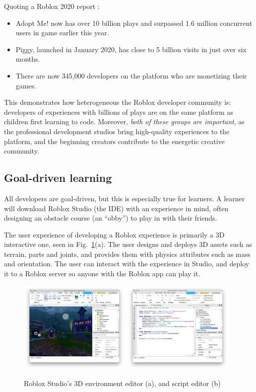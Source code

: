\documentclass[acmsmall]{acmart}
\begin{document}
Quoting a Roblox 2020 report \cite{RobloxDevelopers}:
\begin{itemize}
\item Adopt Me! now has over 10 billion plays and surpassed 1.6 million concurrent users in game earlier this year.
\item Piggy, launched in January 2020, has close to 5 billion visits in just over six months.
\item There are now 345,000 developers on the platform who are monetizing their games.
\end{itemize}
This demonstrates how heterogeneous the Roblox developer community is:
developers of experiences with billions of plays are on the same
platform as children first learning to code. Moreover, \emph{both of
these groups are important}, as the professional development studios
bring high-quality experiences to the platform, and the beginning creators
contribute to the energetic creative community.

\subsection{Goal-driven learning}

All developers are goal-driven, but this is especially true for
learners. A learner will download Roblox Studio (the IDE) with an
experience in mind, often designing an obstacle course (an ``obby'')
to play in with their friends.

The user experience of developing a Roblox experience is primarily a
3D interactive one, seen in Fig.~\ref{fig:studio}(a). The user designs
and deploys 3D assets such as terrain, parts and joints, and provides
them with physics attributes such as mass and orientation. The user
can interact with the experience in Studio, and deploy it to a Roblox
server so anyone with the Roblox app can play it.

\begin{figure}
\includegraphics[width=0.48\textwidth]{studio-mow.png}
\includegraphics[width=0.48\textwidth]{studio-script-editor.png}
\caption{Roblox Studio's 3D environment editor (a), and script editor (b)}
\label{fig:studio}
\end{figure}
\end{document}
